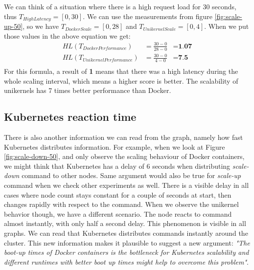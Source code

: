 We can think of a situation where there is a high request load for 30 seconds, thus \(T_{HighLatency}=[0,30]\). We can use the measurements from figure \ref{fig:scale-up-50}, so we have \(T_{DockerScale}=[0,28]\) and \(T_{UnikernelScale}=[0,4]\). When we put those values in the above equation we get:
\begin{equation*}
  \begin{aligned}
  HL(T_{DockerPerformance})&=\frac{30-0}{28-0}&=\textbf{1.07} \\
  HL(T_{UnikernelPerformance})&=\frac{30-0}{4-0}&=\textbf{7.5} \\
  \end{aligned}
\end{equation*}
For this formula, a result of \textbf{1} means that there was a high latency during the whole scaling interval, which means a higher score is better. The scalability of unikernels has 7 times better performance than Docker.

\fi
\subsection{Kubernetes reaction time}
There is also another information we can read from the graph, namely how fast Kubernetes distributes information. For example, when we look at Figure \ref{fig:scale-down-50}, and only observe the scaling behaviour of Docker containers, we might think that Kubernetes has a delay of 6 seconds when distributing \textit{scale-down} command to other nodes. Same argument would also be true for \textit{scale-up} command when we check other experiments as well. There is a visible delay in all cases where node count stays constant for a couple of seconds at start, then changes rapidly with respect to the command. When we observe the unikernel behavior though, we have a different scenario. The node reacts to command almost instantly, with only half a second delay. This phenomenon is visible in all graphs. We can read that Kubernetes distributes commands instantly around the cluster. This new information makes it plausible to suggest a new argument: \textit{"The boot-up times of Docker containers is the bottleneck for Kubernetes scalability and different runtimes with better boot up times might help to overcome this problem"}.


  
